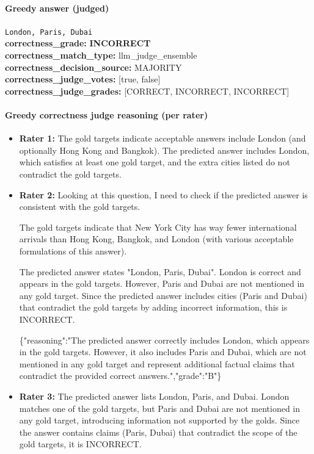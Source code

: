 \documentclass[11pt]{article}
\newcommand{\gradebad}[1]{\textcolor{red!70!black}{\textbf{#1}}}
\newcommand{\mono}[1]{\texttt{#1}}
\begin{document}
\paragraph{Greedy answer (judged)}
\mono{London, Paris, Dubai}\\
\textbf{correctness\_grade:} \gradebad{INCORRECT}\\
\textbf{correctness\_match\_type:} llm\_judge\_ensemble\\
\textbf{correctness\_decision\_source:} MAJORITY\\
\textbf{correctness\_judge\_votes:} [true, false]\\
\textbf{correctness\_judge\_grades:} [CORRECT, INCORRECT, INCORRECT]\\
\paragraph{Greedy correctness judge reasoning (per rater)}
\begin{itemize}
\item \textbf{Rater 1:} The gold targets indicate acceptable answers include London (and optionally Hong Kong and Bangkok). The predicted answer includes London, which satisfies at least one gold target, and the extra cities listed do not contradict the gold targets.
\item \textbf{Rater 2:} Looking at this question, I need to check if the predicted answer is consistent with the gold targets.

The gold targets indicate that New York City has way fewer international arrivals than Hong Kong, Bangkok, and London (with various acceptable formulations of this answer).

The predicted answer states "London, Paris, Dubai". London is correct and appears in the gold targets. However, Paris and Dubai are not mentioned in any gold target. Since the predicted answer includes cities (Paris and Dubai) that contradict the gold targets by adding incorrect information, this is INCORRECT.

\{"reasoning":"The predicted answer correctly includes London, which appears in the gold targets. However, it also includes Paris and Dubai, which are not mentioned in any gold target and represent additional factual claims that contradict the provided correct answers.","grade":"B"\}
\item \textbf{Rater 3:} The predicted answer lists London, Paris, and Dubai. London matches one of the gold targets, but Paris and Dubai are not mentioned in any gold target, introducing information not supported by the golds. Since the answer contains claims (Paris, Dubai) that contradict the scope of the gold targets, it is INCORRECT.
\end{itemize}
\end{document}
